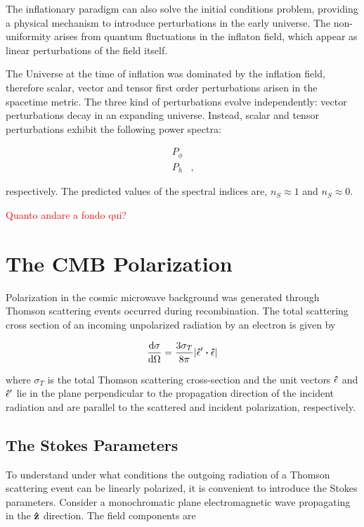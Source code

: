 The inflationary paradigm can also solve the initial conditions problem,
providing a physical mechanism to introduce perturbations in the early
universe. The non-uniformity arises from quantum fluctuations in the
inflaton field, which appear as linear perturbations of the field itself.

The Universe at the time of inflation was dominated by the inflation field,
therefore scalar, vector and tensor first order perturbations arisen in
the spacetime metric. The three kind of perturbations evolve independently:
vector perturbations decay in an expanding universe. Instead, scalar and
tensor perturbations exhibit the following power spectra:

\begin{align}
        P_\phi & \\
        P_h & ,
\end{align}

respectively. The predicted values of the spectral
indices are, $n_S \approx 1$ and $n_S \approx 0$.

\textcolor{red}{Quanto andare a fondo qui?}

\section{The CMB Polarization}

Polarization in the cosmic microwave background was generated through
Thomson scattering events occurred during recombination. The total
scattering cross section of an incoming unpolarized radiation by an
electron is given by

\begin{equation}
        \dv{\sigma}{\Omega} = \frac{3\sigma_T}{8\pi}
        \abs{\vectorunit{\epsilon}' \vdot \vectorunit{\epsilon}}
        \label{eq:thomson_csection}
\end{equation}

where $\sigma_T$ is the total Thomson scattering cross-section and the unit
vectors $\vectorunit{\epsilon}$ and $\vectorunit{\epsilon}'$ lie in the
plane perpendicular to the propagation direction of the incident radiation
and are parallel to the scattered and incident polarization, respectively.

\subsection{The Stokes Parameters}

To understand under what conditions the outgoing radiation of a Thomson
scattering event can be linearly polarized, it is convenient to introduce the
Stokes parameters. Consider a monochromatic plane electromagnetic wave
propagating in the $\vectorunit{z}$ direction. The field components are

